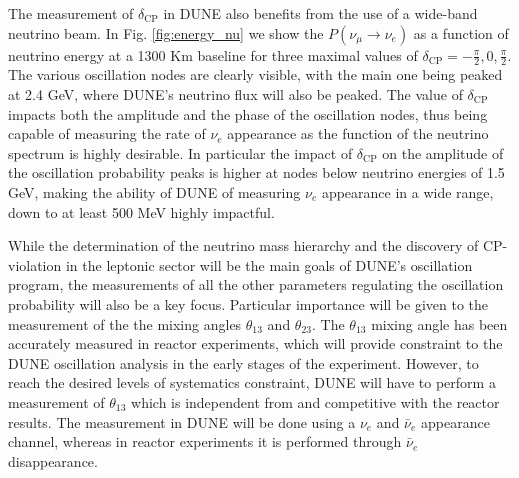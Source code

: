 The measurement of $\delta_\text{CP}$ in DUNE also benefits from the use of a wide-band neutrino beam. In Fig. \ref{fig:energy_nu} we show the $P(\nu_\mu\rightarrow\nu_e)$ as a function of neutrino energy at a 1300 Km baseline for three maximal values of $\delta_\text{CP}=-\frac{\pi}{2},0,\frac{\pi}{2}$. The various oscillation nodes are clearly visible, with the main one being peaked at 2.4 GeV, where DUNE's neutrino flux will also be peaked. The value of $\delta_\text{CP}$ impacts both the amplitude and the phase of the oscillation nodes, thus being capable of measuring the rate of $\nu_e$ appearance as the function of the neutrino spectrum is highly desirable. In particular the impact of $\delta_\text{CP}$ on the amplitude of the oscillation probability peaks is higher at nodes below neutrino energies of 1.5 GeV, making the ability of DUNE of measuring $\nu_e$ appearance in a wide range, down to at least 500 MeV highly impactful.

While the determination of the neutrino mass hierarchy and the discovery of CP-violation in the leptonic sector will be the main goals of DUNE's oscillation program, the measurements of all the other parameters regulating the oscillation probability will also be a key focus. Particular importance will be given to the measurement of the the mixing angles $\theta_{13}$ and $\theta_{23}$. The $\theta_{13}$  mixing angle has been accurately measured in reactor experiments, which will provide constraint to the DUNE oscillation analysis in the early stages of the experiment. However, to reach the desired levels of systematics constraint, DUNE will have to perform a measurement of $\theta_{13}$ which is independent from and competitive with the reactor results. The measurement in DUNE will be done using a $\nu_e$ and $\bar{\nu}_e$ appearance channel, whereas in reactor experiments it is performed through $\bar{\nu}_e$ disappearance.

